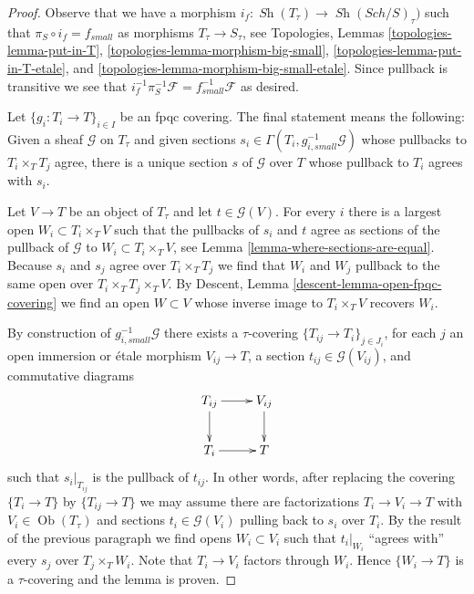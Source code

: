 \documentclass[10pt,a4paper]{amsart}
\theoremstyle{plain}
\theoremstyle{definition}
\theoremstyle{remark}
\numberwithin{equation}{subsection}
\def\Sch{\mathit{Sch}}
\def\Ob{\mathop{\mathrm{Ob}}\nolimits}
\def\Sh{\mathop{\mathit{Sh}}\nolimits}
\begin{document}
\begin{proof}
Observe that we have a morphism $i_f : \Sh(T_\tau) \to \Sh(\Sch/S)_\tau)$
such that $\pi_S \circ i_f = f_{small}$ as morphisms
$T_\tau \to S_\tau$, see
Topologies, Lemmas \ref{topologies-lemma-put-in-T},
\ref{topologies-lemma-morphism-big-small},
\ref{topologies-lemma-put-in-T-etale}, and
\ref{topologies-lemma-morphism-big-small-etale}.
Since pullback is transitive we see that
$i_f^{-1} \pi_S^{-1}\mathcal{F} = f_{small}^{-1}\mathcal{F}$ as desired.

\medskip\noindent
Let $\{g_i : T_i \to T\}_{i \in I}$ be an fpqc covering.
The final statement means the following: Given a sheaf $\mathcal{G}$
on $T_\tau$ and given sections
$s_i \in \Gamma(T_i, g_{i, small}^{-1}\mathcal{G})$ whose pullbacks
to $T_i \times_T T_j$ agree, there is a unique section $s$ of $\mathcal{G}$
over $T$ whose pullback to $T_i$ agrees with $s_i$.

\medskip\noindent
Let $V \to T$ be an object of $T_\tau$ and let $t \in \mathcal{G}(V)$.
For every $i$ there is a largest open $W_i \subset T_i \times_T V$
such that the pullbacks of $s_i$ and $t$ agree as sections of the pullback
of $\mathcal{G}$ to $W_i \subset T_i \times_T V$, see
Lemma \ref{lemma-where-sections-are-equal}.
Because $s_i$ and $s_j$ agree over $T_i \times_T T_j$ we find
that $W_i$ and $W_j$ pullback to the same open over
$T_i \times_T T_j \times_T V$. By
Descent, Lemma \ref{descent-lemma-open-fpqc-covering}
we find an open $W \subset V$ whose inverse image to $T_i \times_T V$
recovers $W_i$. 

\medskip\noindent
By construction of $g_{i, small}^{-1}\mathcal{G}$ there exists
a $\tau$-covering $\{T_{ij} \to T_i\}_{j \in J_i}$, for each $j$ an
open immersion or \'etale morphism $V_{ij} \to T$, a section
$t_{ij} \in \mathcal{G}(V_{ij})$, and commutative diagrams
$$
\xymatrix{
T_{ij} \ar[r] \ar[d] & V_{ij} \ar[d] \\
T_i \ar[r] & T
}
$$
such that $s_i|_{T_{ij}}$ is the pullback of $t_{ij}$. In other words,
after replacing the covering $\{T_i \to T\}$ by $\{T_{ij} \to T\}$
we may assume there are factorizations $T_i \to V_i \to T$ with
$V_i \in \Ob(T_\tau)$ and sections $t_i \in \mathcal{G}(V_i)$
pulling back to $s_i$ over $T_i$.
By the result of the previous paragraph we find opens $W_i \subset V_i$
such that $t_i|_{W_i}$ ``agrees with'' every $s_j$ over $T_j \times_T W_i$.
Note that $T_i \to V_i$ factors through $W_i$.
Hence $\{W_i \to T\}$ is a $\tau$-covering and the lemma is proven.
\end{proof}
\end{document}
